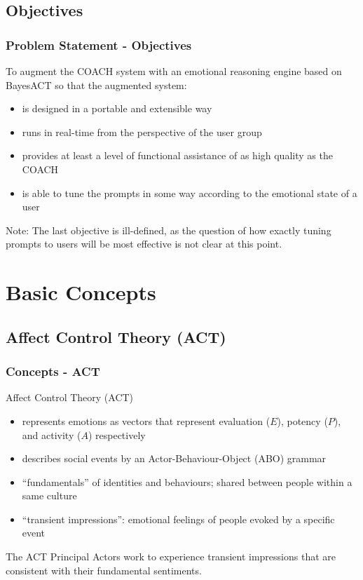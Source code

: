\documentclass{beamer}
\begin{document}
\subsection{Objectives}
\begin{frame}
\frametitle{Problem Statement - Objectives}
To augment the COACH system with an emotional reasoning engine based on BayesACT so that the augmented system:\\
\begin{itemize}
\pause \item is designed in a portable and extensible way
\pause \item runs in real-time from the perspective of the user group
\pause \item provides at least a level of functional assistance of as high quality as the COACH
\pause \item is able to tune the prompts in some way according to the emotional state of a user
\end{itemize}
\vspace{0.3cm}
\pause Note: The last objective is ill-defined, as the question of how exactly tuning prompts to users will be most effective is not clear at this point.
\end{frame}

\section{Basic Concepts}
\subsection{Affect Control Theory (ACT)}
\begin{frame}
\frametitle{Concepts - ACT}
Affect Control Theory (ACT)
\begin{itemize}
\item represents emotions as vectors that represent evaluation ($E$), potency ($P$), and activity ($A$) respectively
\pause \item describes social events by an Actor-Behaviour-Object (ABO) grammar
\pause \item ``fundamentals'' of identities and behaviours; shared between people within a same culture
\pause \item ``transient impressions'': emotional feelings of people evoked by a specific event
\end{itemize}
\begin{block}{The ACT Principal}
Actors work to experience transient impressions that are consistent with their fundamental sentiments.
\end{block}
\end{frame}
\end{document}
